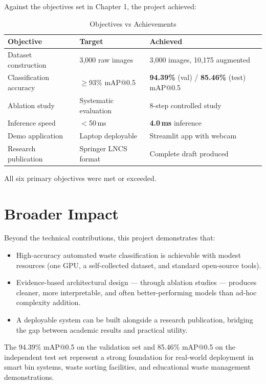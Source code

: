 Against the objectives set in Chapter 1, the project achieved:

\begin{table}[H]
\centering
\caption{Objectives vs Achievements}
\label{tab:objectives}
\footnotesize
\begin{tabular}{lll}
\toprule
\textbf{Objective} & \textbf{Target} & \textbf{Achieved} \\
\midrule
Dataset construction     & 3,000 raw images       & 3,000 images, 10,175 augmented \\
Classification accuracy  & $\geq$93\% mAP@0.5     & \textbf{94.39\%} (val) / \textbf{85.46\%} (test) mAP@0.5 \\
Ablation study           & Systematic evaluation  & 8-step controlled study \\
Inference speed          & $<$50\,ms              & \textbf{4.0\,ms} inference \\
Demo application         & Laptop deployable      & Streamlit app with webcam \\
Research publication     & Springer LNCS format   & Complete draft produced \\
\bottomrule
\end{tabular}
\end{table}

All six primary objectives were met or exceeded.

\section{Broader Impact}

Beyond the technical contributions, this project demonstrates that:
\begin{itemize}
    \item High-accuracy automated waste classification is achievable with modest resources (one GPU, a self-collected dataset, and standard open-source tools).
    \item Evidence-based architectural design — through ablation studies — produces cleaner, more interpretable, and often better-performing models than ad-hoc complexity addition.
    \item A deployable system can be built alongside a research publication, bridging the gap between academic results and practical utility.
\end{itemize}

The 94.39\% mAP@0.5 on the validation set and 85.46\% mAP@0.5 on the independent test set represent a strong foundation for real-world deployment in smart bin systems, waste sorting facilities, and educational waste management demonstrations.
